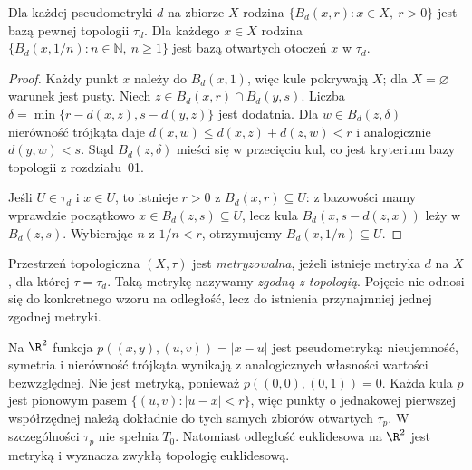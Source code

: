 \begin{stwierdzenie}
\label{prop:topog-baza-kul}
Dla każdej pseudometryki $d$ na zbiorze $X$ rodzina
$\{B_d(x,r):x\in X,\ r>0\}$ jest bazą pewnej topologii
$\tau_d$. Dla każdego $x\in X$ rodzina
$\{B_d(x,1/n):n\in\mathbb N,\ n\ge1\}$ jest bazą otwartych
otoczeń $x$ w $\tau_d$.
\end{stwierdzenie}
\begin{proof}
Każdy punkt $x$ należy do $B_d(x,1)$, więc kule pokrywają
$X$; dla $X=\varnothing$ warunek jest pusty. Niech
$z\in B_d(x,r)\cap B_d(y,s)$. Liczba
$\delta=\min\{r-d(x,z),s-d(y,z)\}$ jest dodatnia.
Dla $w\in B_d(z,\delta)$ nierówność trójkąta daje
$d(x,w)\le d(x,z)+d(z,w)<r$ i analogicznie $d(y,w)<s$.
Stąd $B_d(z,\delta)$ mieści się w przecięciu kul, co jest
kryterium bazy topologii z rozdziału~01.

Jeśli $U\in\tau_d$ i $x\in U$, to istnieje $r>0$ z
$B_d(x,r)\subseteq U$: z bazowości mamy wprawdzie początkowo
$x\in B_d(z,s)\subseteq U$, lecz kula
$B_d(x,s-d(z,x))$ leży w $B_d(z,s)$. Wybierając
$n$ z $1/n<r$, otrzymujemy $B_d(x,1/n)\subseteq U$.
\end{proof}

\begin{definicja}[Metryzowalność]
\label{def:topog-metryzowalnosc}
Przestrzeń topologiczna $(X,\tau)$ jest \emph{metryzowalna},
jeżeli istnieje metryka $d$ na $X$, dla której $\tau=\tau_d$.
Taką metrykę nazywamy \emph{zgodną z topologią}.
Pojęcie nie odnosi się do konkretnego wzoru na odległość,
lecz do istnienia przynajmniej jednej zgodnej metryki.
\end{definicja}

\begin{przyklad}
\label{ex:topog-pseudometryka-r2}
Na $\R^2$ funkcja
$p((x,y),(u,v))=|x-u|$ jest pseudometryką: nieujemność,
symetria i nierówność trójkąta wynikają z analogicznych
własności wartości bezwzględnej. Nie jest metryką, ponieważ
$p((0,0),(0,1))=0$. Każda kula $p$ jest pionowym pasem
$\{(u,v):|u-x|<r\}$, więc punkty o jednakowej pierwszej
współrzędnej należą dokładnie do tych samych zbiorów otwartych
$\tau_p$. W szczególności $\tau_p$ nie spełnia $T_0$.
Natomiast odległość euklidesowa na $\R^2$ jest metryką
i wyznacza zwykłą topologię euklidesową.
\end{przyklad}

